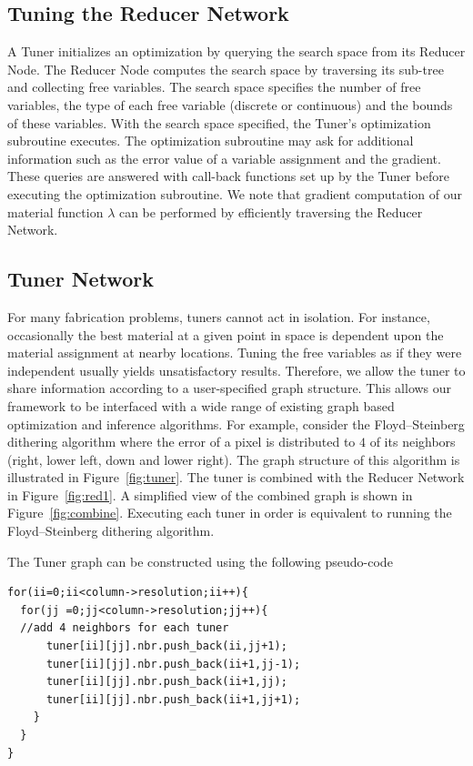 \documentclass[annual]{acmsiggraph}
\begin{document}
\subsection{Tuning the Reducer Network}
A Tuner initializes an optimization by querying the search space from its Reducer Node.
The Reducer Node computes the search space by traversing its sub-tree and collecting
free variables. The search space specifies the number of free variables, the type of each free variable
(discrete or continuous) and the bounds of these variables. With the search space specified, the Tuner's optimization subroutine executes. The optimization subroutine may ask for additional information such as
the error value of a variable assignment and the gradient. These queries are answered
with call-back functions set up by the Tuner before executing the optimization subroutine. We note that gradient computation of our material function $\lambda$ can be performed by efficiently traversing the Reducer Network.
\subsection{Tuner Network}
For many fabrication problems, tuners cannot act in isolation. For instance,  occasionally the best material at a given point in space is dependent upon the material assignment at nearby locations.  Tuning the free variables as if they were independent usually yields unsatisfactory results. Therefore, we allow the tuner to share information according to a user-specified graph structure.  This allows our framework to be interfaced with a wide range of existing graph based optimization and inference algorithms. For example, consider the Floyd–Steinberg dithering algorithm where the error of a pixel is distributed
to $4$ of its neighbors (right, lower left, down and lower right).  The graph structure of this algorithm is illustrated in Figure~\ref{fig:tuner}. The tuner is combined with the Reducer Network in Figure~\ref{fig:red1}. A simplified view of the combined graph is shown in Figure~\ref{fig:combine}. Executing each tuner in order is equivalent to running the Floyd–Steinberg dithering algorithm. 

The Tuner graph can be constructed using the following pseudo-code
\begin{verbatim}
for(ii=0;ii<column->resolution;ii++){
  for(jj =0;jj<column->resolution;jj++){
  //add 4 neighbors for each tuner
      tuner[ii][jj].nbr.push_back(ii,jj+1);
      tuner[ii][jj].nbr.push_back(ii+1,jj-1);
      tuner[ii][jj].nbr.push_back(ii+1,jj);
      tuner[ii][jj].nbr.push_back(ii+1,jj+1);    
    }
  }
}
\end{verbatim}
\end{document}
